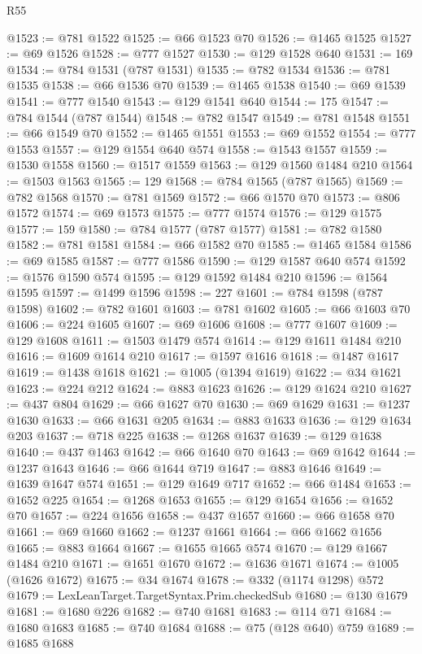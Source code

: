 \begin{lexlean}{R55}
\begin{coremodule}
{{{{{{{{{{{{{{{{{{{{{{{{{{{{{{{{{{{{{{{{{{{{{{{{{{{{{{{{{{{{{{{{{{{{{{{{{{{{{{{{@1523 := @781 @1522
@1525 := @66 @1523 @70
@1526 := @1465 @1525
@1527 := @69 @1526
@1528 := @777 @1527
@1530 := @129 @1528 @640
@1531 := 169
@1534 := @784 @1531 (@787 @1531)
@1535 := @782 @1534
@1536 := @781 @1535
@1538 := @66 @1536 @70
@1539 := @1465 @1538
@1540 := @69 @1539
@1541 := @777 @1540
@1543 := @129 @1541 @640
@1544 := 175
@1547 := @784 @1544 (@787 @1544)
@1548 := @782 @1547
@1549 := @781 @1548
@1551 := @66 @1549 @70
@1552 := @1465 @1551
@1553 := @69 @1552
@1554 := @777 @1553
@1557 := @129 @1554 @640 @574
@1558 := @1543 @1557
@1559 := @1530 @1558
@1560 := @1517 @1559
@1563 := @129 @1560 @1484 @210
@1564 := @1503 @1563
@1565 := 129
@1568 := @784 @1565 (@787 @1565)
@1569 := @782 @1568
@1570 := @781 @1569
@1572 := @66 @1570 @70
@1573 := @806 @1572
@1574 := @69 @1573
@1575 := @777 @1574
@1576 := @129 @1575
@1577 := 159
@1580 := @784 @1577 (@787 @1577)
@1581 := @782 @1580
@1582 := @781 @1581
@1584 := @66 @1582 @70
@1585 := @1465 @1584
@1586 := @69 @1585
@1587 := @777 @1586
@1590 := @129 @1587 @640 @574
@1592 := @1576 @1590 @574
@1595 := @129 @1592 @1484 @210
@1596 := @1564 @1595
@1597 := @1499 @1596
@1598 := 227
@1601 := @784 @1598 (@787 @1598)
@1602 := @782 @1601
@1603 := @781 @1602
@1605 := @66 @1603 @70
@1606 := @224 @1605
@1607 := @69 @1606
@1608 := @777 @1607
@1609 := @129 @1608
@1611 := @1503 @1479 @574
@1614 := @129 @1611 @1484 @210
@1616 := @1609 @1614 @210
@1617 := @1597 @1616
@1618 := @1487 @1617
@1619 := @1438 @1618
@1621 := @1005 (@1394 @1619)
@1622 := @34 @1621
@1623 := @224 @212
@1624 := @883 @1623
@1626 := @129 @1624 @210
@1627 := @437 @804
@1629 := @66 @1627 @70
@1630 := @69 @1629
@1631 := @1237 @1630
@1633 := @66 @1631 @205
@1634 := @883 @1633
@1636 := @129 @1634 @203
@1637 := @718 @225
@1638 := @1268 @1637
@1639 := @129 @1638
@1640 := @437 @1463
@1642 := @66 @1640 @70
@1643 := @69 @1642
@1644 := @1237 @1643
@1646 := @66 @1644 @719
@1647 := @883 @1646
@1649 := @1639 @1647 @574
@1651 := @129 @1649 @717
@1652 := @66 @1484
@1653 := @1652 @225
@1654 := @1268 @1653
@1655 := @129 @1654
@1656 := @1652 @70
@1657 := @224 @1656
@1658 := @437 @1657
@1660 := @66 @1658 @70
@1661 := @69 @1660
@1662 := @1237 @1661
@1664 := @66 @1662 @1656
@1665 := @883 @1664
@1667 := @1655 @1665 @574
@1670 := @129 @1667 @1484 @210
@1671 := @1651 @1670
@1672 := @1636 @1671
@1674 := @1005 (@1626 @1672)
@1675 := @34 @1674
@1678 := @332 (@1174 @1298) @572
@1679 := LexLeanTarget.TargetSyntax.Prim.checkedSub
@1680 := @130 @1679
@1681 := @1680 @226
@1682 := @740 @1681
@1683 := @114 @71
@1684 := @1680 @1683
@1685 := @740 @1684
@1688 := @75 (@128 @640) @759
@1689 := @1685 @1688
}}}}}}}}}}}}}}}}}}}}}}}}}}}}}}}}}}}}}}}}}}}}}}}}}}}}}}}}}}}}}}}}}}}}}}}}}}}}}}}}
\end{coremodule}
\end{lexlean}
